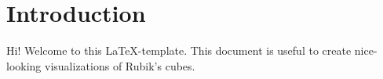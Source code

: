 \section{Introduction}

Hi! 
Welcome to this \LaTeX-template.
This document is useful to create nice-looking visualizations of Rubik's cubes.

\nocite{tronto_2019} 